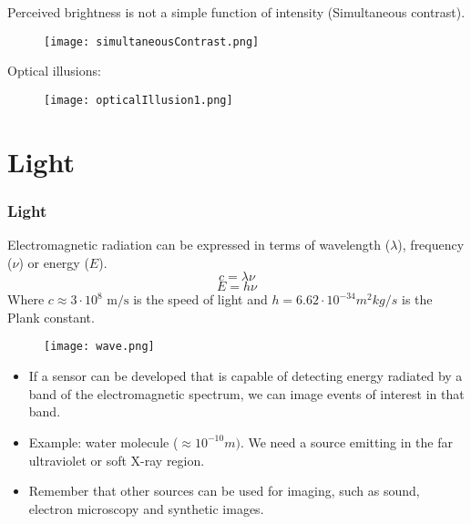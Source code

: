 
\begin{frame}
Perceived brightness is not a simple function of intensity (Simultaneous contrast).
\begin{figure}
\texttt{[image: simultaneousContrast.png]}
\end{figure}
\end{frame}


\begin{frame}
Optical illusions:
\begin{figure}
\texttt{[image: opticalIllusion1.png]}
\end{figure}
\end{frame}


\section{Light}


\begin{frame}
\frametitle{Light}
Electromagnetic radiation can be expressed in terms of wavelength ($\lambda$), frequency ($\nu$) or energy ($E$).
\begin{equation}
c=\lambda\nu
\end{equation}
\begin{equation}
E=h\nu
\end{equation}
Where $c\approx 3\cdot 10^{8}\text{ m/s}$ is the speed of light and $h=6.62\cdot 10^{-34}m^{2}kg/s$ is the Plank constant.
\begin{figure}
\texttt{[image: wave.png]}
\end{figure}
\end{frame}


\begin{frame}
\begin{itemize}
\item If a sensor can be developed that is capable of detecting energy radiated by a band of the electromagnetic spectrum, we can image events of interest in that band.
\item Example: water molecule ($\approx 10^{-10}m)$. We need a source emitting in the far ultraviolet or soft X-ray region.
\item Remember that other sources can be used for imaging, such as sound, electron microscopy and synthetic images.
\end{itemize}
\end{frame}


